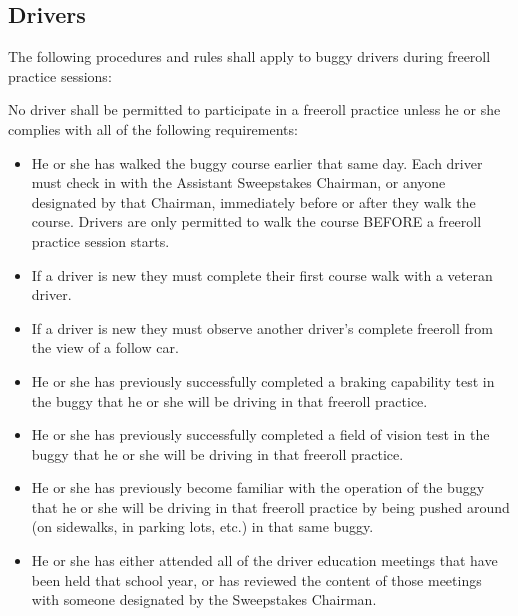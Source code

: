 \subsection{Drivers}

	The following procedures and rules shall apply to buggy drivers during freeroll practice sessions:
	\newline

	\noindent No driver shall be permitted to participate in a freeroll practice unless he or she complies with all of the following requirements:

	\begin{itemize}

		\item
		He or she has walked the buggy course earlier that same day. Each driver must check in with the Assistant Sweepstakes Chairman, or anyone designated by that Chairman, immediately before or after they walk the course. Drivers are only permitted to walk the course BEFORE a freeroll practice session starts.

		\item		
		If a driver is new they must complete their first course walk with a veteran driver. 

		\item
		If a driver is new they must observe another driver's complete freeroll from the view of a follow car.

		\item
		He or she has previously successfully completed a braking capability test in the buggy that he or she will be driving in that freeroll practice.

		\item
		He or she has previously successfully completed a field of vision test in the buggy that he or she will be driving in that freeroll practice.

		\item
		He or she has previously become familiar with the operation of the buggy that he or she will be driving in that freeroll practice by being pushed around (on sidewalks, in parking lots, etc.) in that same buggy.

		\item
		He or she has either attended all of the driver education meetings that have been held that school year, or has reviewed the content of those meetings with someone designated by the Sweepstakes Chairman.

	\end{itemize}
	
